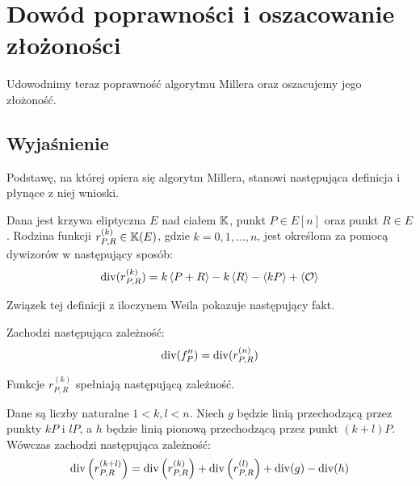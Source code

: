 \section{Dowód poprawności i oszacowanie złożoności}

Udowodnimy teraz poprawność algorytmu Millera
oraz oszacujemy jego złożoność.

\subsection*{Wyjaśnienie}

Podstawę, na której opiera się algorytm Millera,
stanowi następująca definicja i płynące z niej wnioski.

\begin{definition}
Dana jest krzywa eliptyczna $E$ nad ciałem $\mathbb{K}$,
punkt $P \in E[n]$ oraz punkt $R \in E$.
Rodzina funkcji $r_{P,R}^{(k)} \in \mathbb{K}(E)$, gdzie $k = 0, 1, \ldots, n$,
jest określona za pomocą dywizorów
w następujący sposób:
\begin{equation}
\operatorname{div}(r_{P,R}^{(k)}) = k\left\langle P+R\right\rangle - k\left\langle R\right\rangle - \left\langle kP\right\rangle + \left\langle\mathcal{O}\right\rangle
\end{equation}
\end{definition}

Związek tej definicji z iloczynem Weila pokazuje następujący fakt.

\begin{fact}\label{rn_eq_fp_fact}
Zachodzi następująca zależność:
\begin{equation}
\operatorname{div}(f_P'') = \operatorname{div}(r_{P,R}^{(n)})
\end{equation}
\end{fact}

Funkcje $r_{P,R}^{(k)}$ spełniają następującą zależność.

\begin{lemma}\label{dbl_add_lemma}
Dane są liczby naturalne $1 < k,l < n$.
Niech $g$ będzie linią przechodzącą przez punkty $kP$ i $lP$,
a $h$ będzie linią pionową przechodzącą przez punkt $(k+l)P$.
Wówczas zachodzi następująca zależność:
\begin{equation}
\operatorname{div}\left(r_{P,R}^{(k+l)}\right) =
\operatorname{div}\left(r_{P,R}^{(k)}\right) + \operatorname{div}\left(r_{P,R}^{(l)}\right) +
\operatorname{div}(g) - \operatorname{div}(h)
\end{equation}
\end{lemma}

